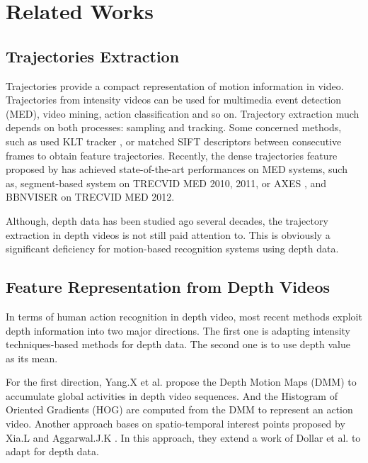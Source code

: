 \documentclass[review]{elsarticle}
\begin{document}
\section{Related Works}
\label{lbl:RelatedWorks}

\subsection{Trajectories Extraction}
Trajectories provide a compact representation of motion information in video. Trajectories from intensity videos can be used for multimedia event detection (MED), video mining, action classification and so on. Trajectory extraction much depends on both processes: sampling and tracking. Some concerned methods, such as \cite{matikainen2009trajectons, messing2009activity} used KLT tracker \cite{lucas1981iterative}, or \cite{sun2009hierarchical} matched  SIFT descriptors between consecutive frames to obtain feature trajectories. Recently, the dense trajectories feature proposed by \cite{wang2011densetraj} has achieved state-of-the-art performances on MED systems, such as, segment-based system \cite{phan2014multimedia} on TRECVID MED 2010, 2011, or AXES \cite{oneata2012axes}, and BBNVISER \cite{natarajan2012bbn} on TRECVID MED 2012.

Although, depth data has been studied ago several decades, the trajectory extraction in depth videos is not still paid attention to. This is obviously a significant deficiency for motion-based recognition systems using depth data.

\subsection{Feature Representation from Depth Videos}
In terms of human action recognition in depth video, most recent methods exploit depth information into two major directions. The first one is adapting intensity techniques-based methods for depth data. The second one is to use depth value as its mean.

For the first direction, Yang.X et al. \cite{yang2012recognizing} propose the Depth Motion Maps (DMM) to accumulate global activities in depth video sequences. And the Histogram of Oriented Gradients (HOG) are computed from the DMM to represent an action video. Another approach bases on spatio-temporal interest points proposed by Xia.L and Aggarwal.J.K \cite{xia2013spatio}. In this approach, they extend a work of Dollar et al. \cite{dollar2005behavior} to adapt for depth data.
\end{document}

